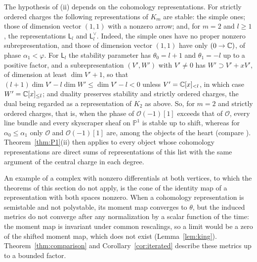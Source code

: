 The hypothesis of (ii) depends on the cohomology representations.
For strictly ordered charges the following representations of $K_m$ are
stable: the simple ones; those of dimension vector $(1,1)$ with a nonzero
arrow; and, for $m=2$ and $l\geq1$, the representations $\mathsf L_l$ and
$\mathsf L_l^\vee$. Indeed, the simple ones have no proper nonzero
subrepresentation, and those of dimension vector $(1,1)$ have only
$(0\to\mathbb C)$, of phase $\alpha_1<\varphi$. For $\mathsf L_l$ the stability
parameter has $\theta_0=l+1$ and $\theta_1=-l$ up to a positive factor, and a
subrepresentation $(V',W')$ with $V'\neq0$ has
$W'\supset V'+xV'$, of dimension at least $\dim V'+1$, so that
$(l+1)\dim V'-l\dim W'\leq\dim V'-l<0$ unless $V'=\mathbb C[x]_{<l}$, in which case
$W'=\mathbb C[x]_{\leq l}$; and duality preserves stability and strictly ordered
charges, the dual being regarded as a representation of $K_2$ as above. So,
for $m=2$ and strictly ordered charges, that is, when the phase of
$\mathcal O(-1)[1]$ exceeds that of $\mathcal O$, every line bundle and
every skyscraper sheaf on $\mathbb P^1$ is stable up to shift, whereas for
$\alpha_0\leq\alpha_1$ only $\mathcal O$ and $\mathcal O(-1)[1]$ are, among
the objects of the heart (compare \cite{oka06}).
Theorem~\ref{thm:P1}(ii) then applies to every object whose cohomology
representations are direct sums of representations of this list with the
same argument of the central charge in each degree.

\begin{remark}\label{rem:scope}
An example of a complex with nonzero differentials at both vertices, to
which the theorems of this section do not apply, is the cone of the identity
map of a representation with both spaces nonzero. When a cohomology
representation is semistable and not polystable, its moment map converges to
$\theta$, but the induced metrics do not converge after any normalization by
a scalar function of the time: the moment map is invariant under common
rescalings, so a limit would be a zero of the shifted moment map, which does
not exist (Lemma~\ref{lem:king}). Theorem~\ref{thm:comparison} and
Corollary~\ref{cor:iterated} describe these metrics up to a bounded
factor.
\end{remark}
